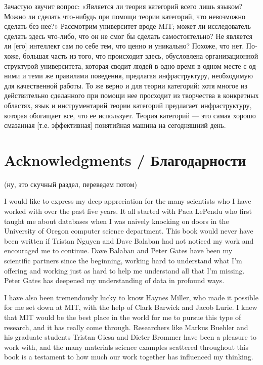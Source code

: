 \documentclass[a4paper]{book}
\theoremstyle{myth}
\begin{document}
\begin{russian}
Зачастую звучит вопрос: «Является ли теория категорий всего лишь языком? Можно ли сделать что-нибудь при помощи теории категорий, что невозможно сделать без нее?» Рассмотрим университет вроде MIT; может ли исследователь сделать здесь что-либо, что он не смог бы сделать самостоятельно? Не является ли [его] интеллект сам по себе тем, что ценно и уникально? Похоже, что нет. Похоже, большая часть из того, что происходит здесь, обусловлена организационной структурой университета, которая сводит людей в одно время в одном месте с одними и теми же правилами поведения, предлагая инфраструктуру, необходимую для качественной работы. То же верно и для теории категорий: хотя многое из действительно сделанного при помощи нее просходит из творчества в конкретных областях, язык и инструментарий теории категорий предлагает инфраструктуру, которая обогащает все, что ее использует. Теория категорий — это самая хорошо смазанная [т.е. эффективная] понятийная машина на сегодняшний день. 


\section{Acknowledgments / Благодарности}

(ну, это скучный раздел, переведем потом) 

I would like to express my deep appreciation for the many scientists who I have worked with over the past five years. It all started with Paea LePendu who first taught me about databases when I was naively knocking on doors in the University of Oregon computer science department. This book would never have been written if Tristan Nguyen and Dave Balaban had not noticed my work and encouraged me to continue. Dave Balaban and Peter Gates have been my scientific partners since the beginning, working hard to understand what I'm offering and working just as hard to help me understand all that I'm missing. Peter Gates has deepened my understanding of data in profound ways.

 

I have also been tremendously lucky to know Haynes Miller, who made it possible for me set down at MIT, with the help of Clark Barwick and Jacob Lurie. I knew that MIT would be the best place in the world for me to pursue this type of research, and it has really come through. Researchers like Markus Buehler and his graduate students Tristan Giesa and Dieter Brommer have been a pleasure to work with, and the many materials science examples scattered throughout this book is a testament to how much our work together has influenced my thinking.


\end{russian}
\end{document}
